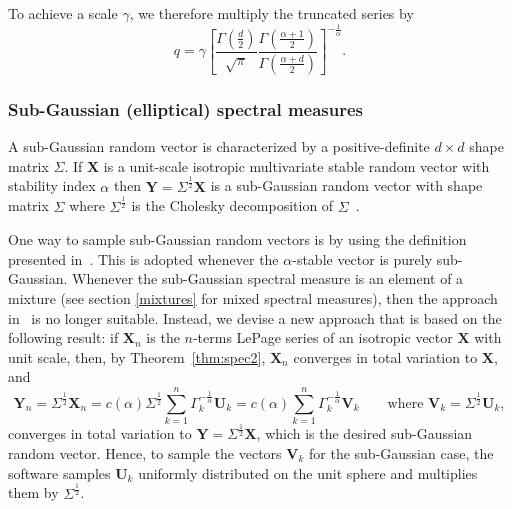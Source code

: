 To achieve a scale $\gamma$, we therefore multiply the truncated series by
\begin{equation*}
    q=\gamma\left[\frac{\Gamma\left(\frac{d}{2}\right)}{\sqrt{\pi}}\frac{\Gamma\left(\frac{\alpha+1}{2}\right)}{\Gamma\left(\frac{\alpha+d}{2}\right)}\right]^{-\frac{1}{\alpha}}.
\end{equation*}

\subsubsection{Sub-Gaussian (elliptical) spectral measures}
\label{sub_guass_error}

A sub-Gaussian random vector is characterized by a  positive-definite $d\times d$ shape matrix $\Sigma$. If $\mathbf{X}$ is a unit-scale  isotropic multivariate stable random vector with stability index $\alpha$ then $\mathbf{Y}=\Sigma^{\frac{1}{2}}\mathbf{X}$ is a sub-Gaussian random vector with shape matrix $\Sigma$ where $\Sigma^{\frac{1}{2}}$ is the Cholesky decomposition of $\Sigma$~\citep{nolancirc2013}.

One way to sample sub-Gaussian random vectors is by using the definition presented in~\cite[Definition 2.5.1]{SamorodnitskyGennady2000Snrp}. This is adopted whenever the $\alpha$-stable vector is purely sub-Gaussian. Whenever the sub-Gaussian spectral measure is an element of a mixture (see section \ref{mixtures} for mixed spectral measures), then the approach in~\cite[Definition 2.5.1]{SamorodnitskyGennady2000Snrp} is no longer suitable.  Instead, we devise a new approach that is based on the following result: if $\mathbf{X}_n$ is the $n$-terms LePage series of an isotropic vector $\mathbf{X}$ with unit scale, then, by Theorem~\ref{thm:spec2}, $\mathbf{X}_n$ converges in total variation to $\mathbf{X}$, and \begin{equation}
\label{required_V}
\mathbf{Y}_n=\Sigma^{\frac{1}{2}}\mathbf{X}_n=c(\alpha)\Sigma^{\frac{1}{2}}\sum_{k=1}^n\Gamma_k^{-\frac{1}{\alpha}}\mathbf{U}_k=c(\alpha)\sum_{k=1}^n\Gamma_k^{-\frac{1}{\alpha}}\mathbf{V}_k \qquad \text{where } \mathbf{V}_k=\Sigma^{\frac{1}{2}}\mathbf{U}_k,
\end{equation}
converges in total variation to $\mathbf{Y}=\Sigma^{\frac{1}{2}}\mathbf{X}$, which is the desired sub-Gaussian random vector. Hence, to sample the vectors $\mathbf{V}_k$ for the sub-Gaussian case, the software samples  $\mathbf{U}_k$ uniformly distributed on the unit sphere and multiplies them by $\Sigma^{\frac{1}{2}}$.

